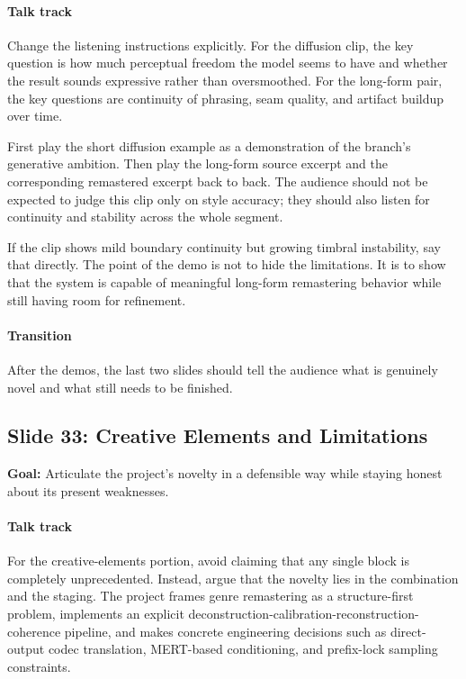 \documentclass[11pt]{article}
\begin{document}
\paragraph{Talk track}
Change the listening instructions explicitly. For the diffusion clip, the key question is how much perceptual freedom the model seems to have and whether the result sounds expressive rather than oversmoothed. For the long-form pair, the key questions are continuity of phrasing, seam quality, and artifact buildup over time.

First play the short diffusion example as a demonstration of the branch's generative ambition. Then play the long-form source excerpt and the corresponding remastered excerpt back to back. The audience should not be expected to judge this clip only on style accuracy; they should also listen for continuity and stability across the whole segment.

If the clip shows mild boundary continuity but growing timbral instability, say that directly. The point of the demo is not to hide the limitations. It is to show that the system is capable of meaningful long-form remastering behavior while still having room for refinement.

\paragraph{Transition}
After the demos, the last two slides should tell the audience what is genuinely novel and what still needs to be finished.

\subsection*{Slide 33: Creative Elements and Limitations}
\textbf{Goal:} Articulate the project's novelty in a defensible way while staying honest about its present weaknesses.
\paragraph{Talk track}
For the creative-elements portion, avoid claiming that any single block is completely unprecedented. Instead, argue that the novelty lies in the combination and the staging. The project frames genre remastering as a structure-first problem, implements an explicit deconstruction-calibration-reconstruction-coherence pipeline, and makes concrete engineering decisions such as direct-output codec translation, MERT-based conditioning, and prefix-lock sampling constraints.
\end{document}
